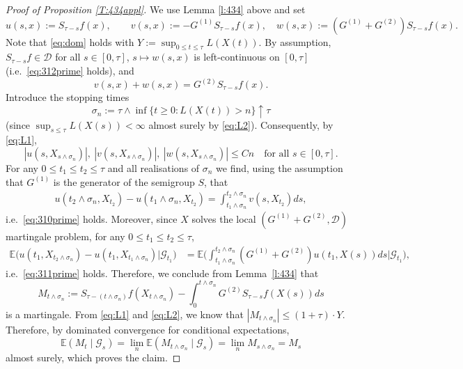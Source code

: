 \documentclass{imsart}
\theoremstyle{plain}
\theoremstyle{definition}
\begin{document}
\begin{appendix}
\begin{proof}[Proof of Proposition \ref{T:434appl}]
    We use Lemma \ref{l:434} above and set 
    $$ u(s,x) := S_{\tau-s}f(x), \qquad v(s,x) := -G^{(1)} S_{\tau-s}f(x), \quad w(s,x) := (G^{(1)}+G^{(2)}) S_{\tau-s}f(x).$$
    Note that \eqref{eq:dom} holds with $Y := \sup_{0\leq t\leq \tau} L(X(t))$. By assumption, $S_{\tau-s}f \in \mathcal D$ for all $s \in [0,\tau]$, $s \mapsto w(s,x)$ is left-continuous on $[0,\tau]$ (i.e.\ \eqref{eq:312prime} holds), and
    \begin{equation*}\label{vw} v(s,x) + w(s,x) = G^{(2)} S_{\tau-s}f(x).
    \end{equation*}
    Introduce the stopping times $$\sigma_n := \tau \wedge \inf\{t \geq 0: L(X(t)) > n\} \uparrow \tau$$
    (since $\sup_{s\leq\tau} L(X(s)) < \infty$ almost surely by \eqref{eq:L2}). Consequently, by \eqref{eq:L1},
    $$ |u(s,X_{s\wedge \sigma_n})|,\ |v(s,X_{s\wedge \sigma_n})|,\ |w(s,X_{s\wedge \sigma_n})| \leq C n \quad \text{for all } s\in [0,\tau].$$
    For any $0 \le t_1 \le t_2 \le \tau$ and all realisations of $\sigma_n$ we find, using the assumption that $G^{(1)}$ is the generator of the semigroup $S$, that
    \begin{align*}
        u(t_2 \wedge \sigma_n, X_{t_2}) - u(t_1 \wedge \sigma_n, X_{t_2}) = \int_{t_1 \wedge \sigma_n}^{t_2 \wedge \sigma_n} v(s,X_{t_2}) ds,
    \end{align*}
    i.e.\ \eqref{eq:310prime} holds. 
    Moreover, since $X$ solves the local $(G^{(1)} + G^{(2)}, \mathcal D)$ martingale problem, for any $0\leq t_1 \leq t_2 \leq \tau$,
    \begin{align*}
        \mathbb E\big(u(t_1, X_{t_2\wedge \sigma_n}) - u(t_1, X_{t_1\wedge \sigma_n}) | \mathcal G_{t_1}\big) & = \mathbb E \Big( \int_{t_1 \wedge \sigma_n}^{t_2 \wedge \sigma_n} (G^{(1)} + G^{(2)})u(t_1, X(s)) ds \Big| \mathcal G_{t_1}\Big),
    \end{align*}
    i.e.\ \eqref{eq:311prime} holds.  Therefore, we conclude from Lemma~\ref{l:434} that
    $$ M_{t\wedge \sigma_n} := S_{\tau - (t\wedge \sigma_n)} f(X_{t\wedge\sigma_n}) - \int_0^{t\wedge \sigma_n} G^{(2)} S_{\tau-s} f(X(s)) ds $$
    is a martingale. From \eqref{eq:L1} and \eqref{eq:L2}, we know that $|M_{t\wedge\sigma_n}| \leq (1+\tau)\cdot Y$. Therefore, by dominated convergence for conditional expectations, 
    $$ \mathbb E(M_t \mid \mathcal G_s) = \lim_n \mathbb E(M_{t\wedge\sigma_n} \mid \mathcal G_s) = \lim_n M_{s\wedge\sigma_n} = M_s$$
    almost surely, which proves the claim. 
\end{proof}


\end{appendix}
\end{document}
